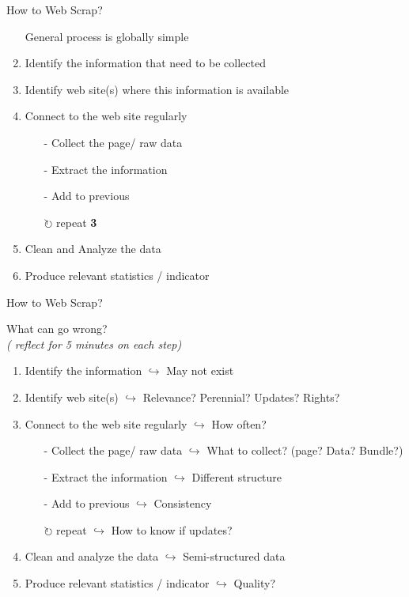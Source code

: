 \documentclass[xcolor=x11names,compress]{beamer}
\renewcommand{\(}{\begin{columns}}
\renewcommand{\)}{\end{columns}}
\newcommand{\<}[1]{\begin{column}{#1}}
\renewcommand{\>}{\end{column}}
\begin{document}
\begin{frame}{How to  Web Scrap?}

\pause
\begin{enumerate}[<+->]
    \item[] General process is globally simple
    \item Identify the information that need to be collected
    \item Identify web site(s) where this information is available
    \item Connect to the web site regularly
    \begin{itemize}[<+->]
         \item[-] Collect the page/ raw data
         \item[-] Extract the information
         \item[-] Add to previous
        \item[$\circlearrowright$] repeat \textbf{3}
    \end{itemize}
    \item Clean and Analyze the data
    \item Produce relevant statistics / indicator
\end{enumerate}
\end{frame}

\begin{frame}{How to  Web Scrap?}
\begin{center}
  \large{What can go wrong?}\\

\emph{( reflect for  5 minutes on each step)}
\end{center}
\pause

\begin{enumerate}[<+->]
    \item Identify the information $\hookrightarrow$ May not exist
    \item Identify web site(s) $\hookrightarrow$ Relevance? Perennial? Updates? Rights?
    \item Connect to the web site regularly $\hookrightarrow$ How often?
    \begin{itemize}[<+->]
        \item[-] Collect the page/ raw data $\hookrightarrow$ What to collect? (page? Data? Bundle?)
        \item[-] Extract the information $\hookrightarrow$ Different structure
        \item[-] Add to previous $\hookrightarrow$ Consistency
        \item[$\circlearrowright$] repeat $\hookrightarrow$ How to know if updates?
    \end{itemize}
    \item Clean and analyze the data $\hookrightarrow$ Semi-structured data
    \item Produce relevant statistics / indicator $\hookrightarrow$ Quality?
\end{enumerate}
\end{frame}
\end{document}
